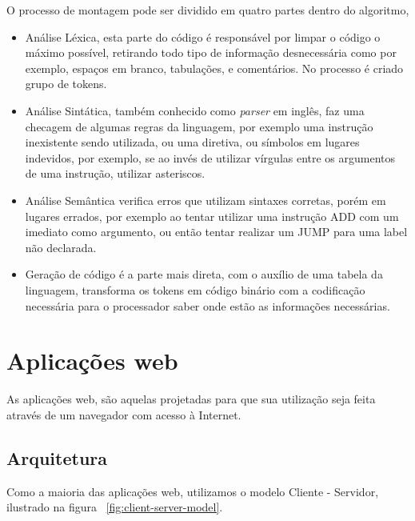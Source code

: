 		O processo de montagem pode ser dividido em quatro partes dentro do algoritmo,

		\begin{itemize}
			\item Análise Léxica, esta parte do código é responsável por limpar o código o máximo possível, retirando todo tipo de informação desnecessária como por exemplo, espaços em branco, tabulações, e comentários. No processo é criado grupo de tokens.
			\item Análise Sintática, também conhecido como \textit{parser} em inglês, faz uma checagem de algumas regras da linguagem, por exemplo uma instrução inexistente sendo utilizada, ou uma diretiva, ou símbolos em lugares indevidos, por exemplo, se ao invés de utilizar vírgulas entre os argumentos de uma instrução, utilizar asteriscos.
			\item Análise Semântica verifica erros que utilizam sintaxes corretas, porém em lugares errados, por exemplo ao tentar utilizar uma instrução ADD com um imediato como argumento, ou então tentar realizar um JUMP para uma label não declarada. 
			\item Geração de código é a parte mais direta, com o auxílio de uma tabela da linguagem, transforma os tokens em código binário com a codificação necessária para o processador saber onde estão as informações necessárias.
		\end{itemize} 


\section{Aplicações web}

	As aplicações web, são aquelas projetadas para que sua utilização seja feita através de um navegador com acesso à Internet.

	\subsection{Arquitetura}
		
		Como a maioria das aplicações web, utilizamos o modelo Cliente - Servidor, ilustrado na figura ~\ref{fig:client-server-model}.


